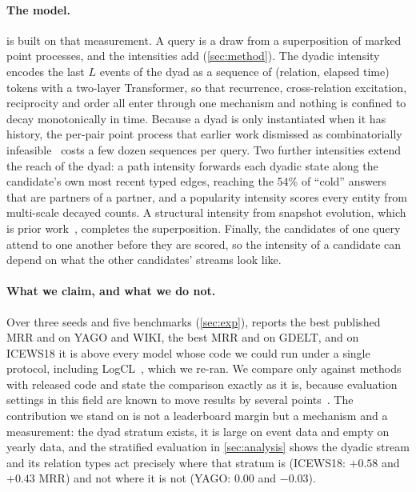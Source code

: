 \paragraph{The model.} \model{} is built on that measurement. A query is a draw from a superposition of marked point processes, and the intensities add (\cref{sec:method}). The dyadic intensity encodes the last $L$ events of the dyad as a sequence of (relation, elapsed time) tokens with a two-layer Transformer, so that recurrence, cross-relation excitation, reciprocity and order all enter through one mechanism and nothing is confined to decay monotonically in time. Because a dyad is only instantiated when it has history, the per-pair point process that earlier work dismissed as combinatorially infeasible~\cite{han2020ghnn} costs a few dozen sequences per query. Two further intensities extend the reach of the dyad: a path intensity forwards each dyadic state along the candidate's own most recent typed edges, reaching the 54\% of ``cold'' answers that are partners of a partner, and a popularity intensity scores every entity from multi-scale decayed counts. A structural intensity from snapshot evolution, which is prior work~\cite{li2021regcn,dong2025dimnet}, completes the superposition. Finally, the candidates of one query attend to one another before they are scored, so the intensity of a candidate can depend on what the other candidates' streams look like.

\paragraph{What we claim, and what we do not.} Over three seeds and five benchmarks (\cref{sec:exp}), \model{} reports the best published MRR and \hone{} on YAGO and WIKI, the best MRR and \hone{} on GDELT, and on ICEWS18 it is above every model whose code we could run under a single protocol, including LogCL~\cite{chen2024logcl}, which we re-ran. We compare only against methods with released code and state the comparison exactly as it is, because evaluation settings in this field are known to move results by several points~\cite{gastinger2023apples}. The contribution we stand on is not a leaderboard margin but a mechanism and a measurement: the dyad stratum exists, it is large on event data and empty on yearly data, and the stratified evaluation in \cref{sec:analysis} shows the dyadic stream and its relation types act precisely where that stratum is (ICEWS18: $+0.58$ and $+0.43$ MRR) and not where it is not (YAGO: $0.00$ and $-0.03$).

